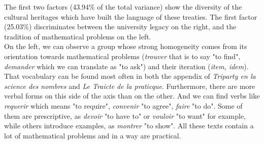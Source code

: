 \documentclass[preprint]{elsarticle}
\begin{document}
%
%
%
%
%

The first two factors (43.94\% of the total variance) show the diversity of the cultural heritages which have built  the language of these treaties. The first factor (25.03\%) discriminates between the university legacy on the right, and the tradition of mathematical problems on the left.\\

On the left, we can observe a group whose strong homogeneity comes from its orientation towards mathematical problems (\textit{trouver} that is to say "to find", \textit{demander} which we can translate as "to ask") and their iteration (\textit{item, idem}). That vocabulary can be found most often in both the appendix of \textit{Triparty en la science des nombres} and \textit{Le Traicte de la praticque}. Furthermore, there are more verbal forms on this side of the axis than on the other. And we can find verbs like \textit{requerir} which means "to require", \textit{convenir} "to agree", \textit{faire} "to do". Some of them are prescriptive, as \textit{devoir} "to have to" or \textit{vouloir} "to want" for example, while others introduce examples, as \textit{montrer} "to show". All these texts contain a lot of mathematical problems and in a way are practical.\\
\end{document}
